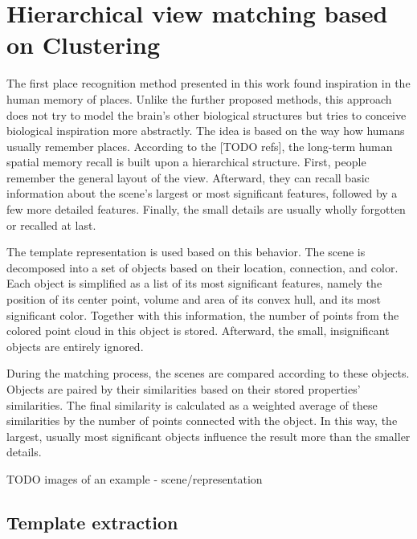 \section{Hierarchical view matching based on Clustering}\label{section:hierarchical}

The first place recognition method presented in this work found inspiration in the human memory of places. Unlike the further proposed methods, this approach does not try to model the brain's other biological structures but tries to conceive biological inspiration more abstractly. The idea is based on the way how humans usually remember places. According to the [TODO refs], the long-term human spatial memory recall is built upon a hierarchical structure. First, people remember the general layout of the view. Afterward, they can recall basic information about the scene's largest or most significant features, followed by a few more detailed features. Finally, the small details are usually wholly forgotten or recalled at last.\par
The template representation is used based on this behavior. The scene is decomposed into a set of objects based on their location, connection, and color. Each object is simplified as a list of its most significant features, namely the position of its center point, volume and area of its convex hull, and its most significant color. Together with this information, the number of points from the colored point cloud in this object is stored. Afterward, the small, insignificant objects are entirely ignored.\par
During the matching process, the scenes are compared according to these objects. Objects are paired by their similarities based on their stored properties' similarities. The final similarity is calculated as a weighted average of these similarities by the number of points connected with the object. In this way, the largest, usually most significant objects influence the result more than the smaller details.\par

TODO images of an example - scene/representation

\subsection{Template extraction}

